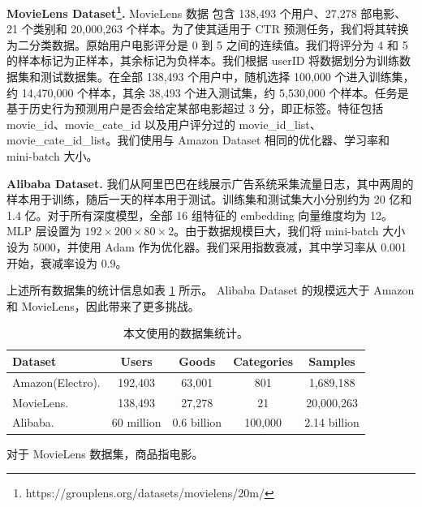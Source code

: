     
\textbf{MovieLens Dataset\footnote{https://grouplens.org/datasets/movielens/20m/}.} MovieLens 数据\cite{MovieLens} 包含 138,493 个用户、27,278 部电影、21 个类别和 20,000,263 个样本。为了使其适用于 CTR 预测任务，我们将其转换为二分类数据。原始用户电影评分是 0 到 5 之间的连续值。我们将评分为 4 和 5 的样本标记为正样本，其余标记为负样本。我们根据 userID 将数据划分为训练数据集和测试数据集。在全部 138,493 个用户中，随机选择 100,000 个进入训练集，约 14,470,000 个样本，其余 38,493 个进入测试集，约 5,530,000 个样本。任务是基于历史行为预测用户是否会给定某部电影超过 3 分，即正标签。特征包括 movie\_id、movie\_cate\_id 以及用户评分过的 movie\_id\_list、movie\_cate\_id\_list。我们使用与 Amazon Dataset 相同的优化器、学习率和 mini-batch 大小。

\textbf{Alibaba Dataset.} 我们从阿里巴巴在线展示广告系统采集流量日志，其中两周的样本用于训练，随后一天的样本用于测试。训练集和测试集大小分别约为 20 亿和 1.4 亿。对于所有深度模型，全部 16 组特征的 embedding 向量维度均为 12。%
MLP 层设置为 $192 \times 200 \times 80 \times 2$。由于数据规模巨大，我们将 mini-batch 大小设为 5000，并使用 Adam\cite{Adam} 作为优化器。我们采用指数衰减，其中学习率从 0.001 开始，衰减率设为 0.9。

上述所有数据集的统计信息如表 \ref{table:Statistics} 所示。
Alibaba Dataset 的规模远大于 Amazon 和 MovieLens，因此带来了更多挑战。

    
\begin{table}[!t]
\caption{本文使用的数据集统计。}
\small
\centering
\begin{threeparttable}
\begin{tabular}{lcccc}
\toprule
    Dataset       & Users & Goods\tnote{a} & Categories & Samples \\ \midrule
Amazon(Electro). & 192,403 & 63,001 & 801 & 1,689,188 \\ 
MovieLens. & 138,493 & 27,278 & 21 & 20,000,263 \\
Alibaba.  & 60 million & 0.6 billion & 100,000 & 2.14 billion \\ 
\bottomrule
\end{tabular}
\begin{tablenotes}%
        \item[a] 对于 MovieLens 数据集，商品指电影。
      \end{tablenotes}
      \end{threeparttable}
\label{table:Statistics}
\end{table}    




